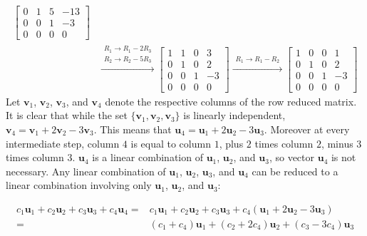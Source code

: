 \documentclass{article}
\begin{document}
\begin{itemize}
\begin{align*}
\begin{bmatrix}
0 & 1 & 5 & -13 \\
0 & 0 & 1 &   -3 \\
0 & 0 & 0 &    0
\end{bmatrix} \\
& \xrightarrow{\begin{array}{c} R_1 \rightarrow R_1 - 2R_3 \\ R_2 \rightarrow R_2 - 5R_3 \end{array}} \begin{bmatrix}
1 & 1 & 0 &  3 \\
0 & 1 & 0 &  2 \\
0 & 0 & 1 & -3 \\
0 & 0 & 0 &  0
\end{bmatrix} \xrightarrow{\begin{array}{c} R_1 \rightarrow R_1 - R_2 \end{array}} \begin{bmatrix}
1 & 0 & 0 &  1 \\
0 & 1 & 0 &  2 \\
0 & 0 & 1 & -3 \\
0 & 0 & 0 &  0
\end{bmatrix}
\end{align*}
Let \(\mathbf{v}_1\), \(\mathbf{v}_2\), \(\mathbf{v}_3\), and \(\mathbf{v}_4\) denote the respective columns of the row reduced matrix. It is clear that while the set \(\{\mathbf{v}_1, \mathbf{v}_2, \mathbf{v}_3\}\) is linearly independent, \(\mathbf{v}_4 = \mathbf{v}_1 + 2\mathbf{v}_2 - 3\mathbf{v}_3\). This means that \(\mathbf{u}_4 = \mathbf{u}_1 + 2\mathbf{u}_2 - 3\mathbf{u}_3\). Moreover at every intermediate step, column \(4\) is equal to column \(1\), plus \(2\) times column \(2\), minus \(3\) times column \(3\). \(\mathbf{u}_4\) is a linear combination of \(\mathbf{u}_1\), \(\mathbf{u}_2\), and \(\mathbf{u}_3\), so vector \(\mathbf{u}_4\) is not necessary. Any linear combination of \(\mathbf{u}_1\), \(\mathbf{u}_2\), \(\mathbf{u}_3\), and \(\mathbf{u}_4\) can be reduced to a linear combination involving only \(\mathbf{u}_1\), \(\mathbf{u}_2\), and \(\mathbf{u}_3\):

\begin{align*}   
c_1 \mathbf{u}_1 + c_2 \mathbf{u}_2 + c_3 \mathbf{u}_3 + c_4 \mathbf{u}_4 
= & c_1 \mathbf{u}_1 + c_2 \mathbf{u}_2 + c_3 \mathbf{u}_3 + c_4 (\mathbf{u}_1 + 2\mathbf{u}_2 - 3\mathbf{u}_3) \\
= & (c_1 + c_4)\mathbf{u}_1 + (c_2 + 2c_4)\mathbf{u}_2 + (c_3 - 3c_4)\mathbf{u}_3
\end{align*}   


\end{itemize}
\end{document}
